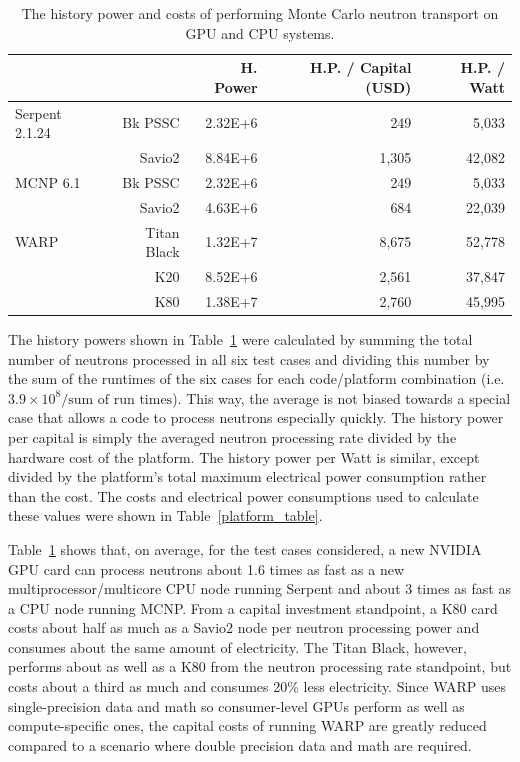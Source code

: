 \documentclass[preprint,12pt]{elsarticle}
\begin{document}
\begin{table}[h]
\centering
\caption{The history power and costs of performing Monte Carlo neutron transport on GPU and CPU systems.}
\label{history_power}
\small
\begin{tabular}{| l r | r | r | r |}
\cline{3-5}
\multicolumn{2}{c|}{}             & H. Power   & H.P. / Capital (USD)   & H.P. / Watt  \\
\hline                            
Serpent 2.1.24   &   Bk PSSC      & 2.32E+6    &   249           &  5,033        \\
                 &   Savio2       & 8.84E+6    & 1,305           & 42,082        \\
\hline                                 
MCNP 6.1         &   Bk PSSC      & 2.32E+6    &   249           &  5,033        \\
                 &   Savio2       & 4.63E+6    &   684           & 22,039        \\
\hline                            
WARP             &   Titan Black  & 1.32E+7    & 8,675           & 52,778        \\
                 &   K20          & 8.52E+6    & 2,561           & 37,847        \\
                 &   K80          & 1.38E+7    & 2,760           & 45,995        \\
\hline
\end{tabular}
\end{table}

The history powers shown in Table~\ref{history_power} were calculated by summing the total number of neutrons processed in all six test cases and dividing this number by the sum of the runtimes of the six cases for each code/platform combination (i.e.\ $3.9\times10^8 / \textrm{sum of run times}$).  This way, the average is not biased towards a special case that allows a code to process neutrons especially quickly.  The history power per capital is simply the averaged neutron processing rate divided by the hardware cost of the platform.  The history power per Watt is similar, except divided by the platform's total maximum electrical power consumption rather than the cost.  The costs and electrical power consumptions used to calculate these values were shown in Table~\ref{platform_table}.


Table~\ref{history_power} shows that, on average, for the test cases considered, a new NVIDIA GPU card can process neutrons about 1.6 times as fast as a new multiprocessor/multicore CPU node running Serpent and about 3 times as fast as a CPU node running MCNP.  From a capital investment standpoint, a K80 card costs about half as much as a Savio2 node per neutron processing power and consumes about the same amount of electricity.  The Titan Black, however, performs about as well as a K80 from the neutron processing rate standpoint, but costs about a third as much and consumes 20\% less electricity.  Since WARP uses single-precision data and math so consumer-level GPUs perform as well as compute-specific ones, the capital costs of running WARP are greatly reduced compared to a scenario where double precision data and math are required. 
\end{document}

